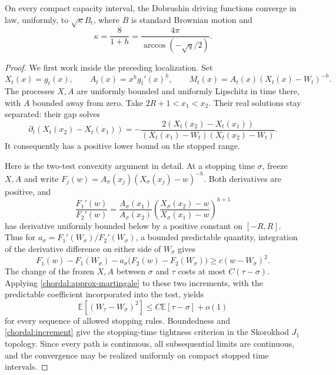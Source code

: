\begin{proposition}\label{chordal:driver}
On every compact capacity interval, the Dobrushin driving functions
converge in law, uniformly, to $\sqrt\kappa B_t$, where $B$ is standard
Brownian motion and
\begin{equation}\label{chordal:kappa}
 \kappa=\frac{8}{1+h}
        =\frac{4\pi}{\arccos(-\sqrt q/2)}.
\end{equation}
\end{proposition}

\begin{proof}
We first work inside the preceding localization.  Set
\[
 X_t(x)=g_t(x),\qquad A_t(x)=x^h g_t'(x)^h,
 \qquad M_t(x)=A_t(x)(X_t(x)-W_t)^{-h}.
\]
The processes $X,A$ are uniformly bounded and uniformly Lipschitz
in time there, with $A$ bounded away from zero.  Take
$2R+1<x_1<x_2$.  Their real solutions stay separated: their gap
solves
\[
 \partial_t(X_t(x_2)-X_t(x_1))
 =-\frac{2(X_t(x_2)-X_t(x_1))}
 {(X_t(x_1)-W_t)(X_t(x_2)-W_t)}.
\]
It consequently has a positive lower bound on the stopped range.

Here is the two-test convexity argument in detail.
At a stopping time $\sigma$, freeze $X,A$ and write
$F_j(w)=A_\sigma(x_j)(X_\sigma(x_j)-w)^{-h}$.
Both derivatives are positive, and
\[
 \frac{F_1'(w)}{F_2'(w)}
 =\frac{A_\sigma(x_1)}{A_\sigma(x_2)}
   \left(\frac{X_\sigma(x_2)-w}{X_\sigma(x_1)-w}\right)^{h+1}
\]
has derivative uniformly bounded below by a positive constant on
$[-R,R]$.  Thus for
$a_\sigma=F_1'(W_\sigma)/F_2'(W_\sigma)$, a bounded predictable
quantity, integration of the derivative difference on either side
of $W_\sigma$ gives
\begin{equation}\label{chordal:two-test}
 F_1(w)-F_1(W_\sigma)
 -a_\sigma\bigl(F_2(w)-F_2(W_\sigma)\bigr)
 \ge c(w-W_\sigma)^2.
\end{equation}
The change of the frozen $X,A$ between $\sigma$ and $\tau$ costs at
most $C(\tau-\sigma)$.  Applying
\eqref{chordal:approx-martingale} to these two increments, with the
predictable coefficient incorporated into the test, yields
\begin{equation}\label{chordal:increment}
 \mathbb E[(W_\tau-W_\sigma)^2]
 \le C\mathbb E[\tau-\sigma]+o(1)
\end{equation}
for every sequence of allowed stopping rules.  Boundedness and
\eqref{chordal:increment} give the stopping-time tightness criterion
in the Skorokhod $J_1$ topology.  Since every path is continuous,
all subsequential limits are continuous, and the convergence may
be realized uniformly on compact stopped time intervals.


\end{proof}
